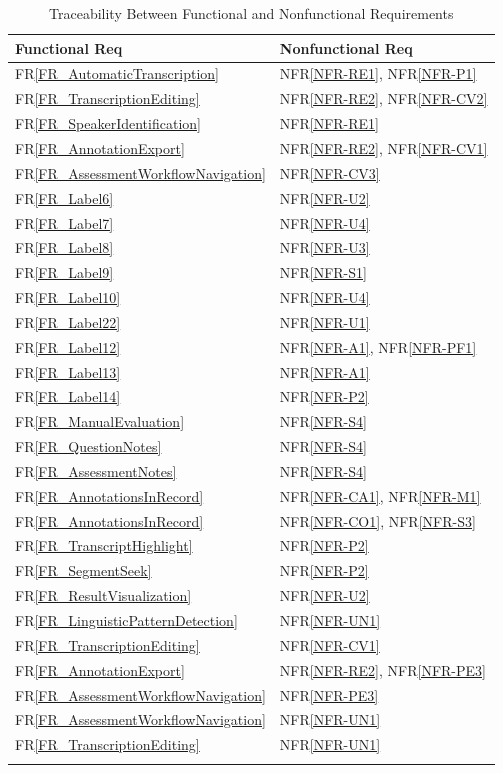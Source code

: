 \documentclass[12pt]{article}
\newcommand{\rref}[1]{FR\ref{#1}}
\newcommand{\nfrref}[1]{NFR\ref{#1}}
\begin{document}
\begin{longtable}{p{} p{}}

\toprule
Functional Req & Nonfunctional Req \\
\midrule
\rref{FR_AutomaticTranscription} & \nfrref{NFR-RE1}, \nfrref{NFR-P1} \\
\rref{FR_TranscriptionEditing} & \nfrref{NFR-RE2}, \nfrref{NFR-CV2} \\
\rref{FR_SpeakerIdentification} & \nfrref{NFR-RE1} \\
\rref{FR_AnnotationExport} & \nfrref{NFR-RE2}, \nfrref{NFR-CV1} \\
\rref{FR_AssessmentWorkflowNavigation} & \nfrref{NFR-CV3} \\
\rref{FR_Label6} & \nfrref{NFR-U2} \\
\rref{FR_Label7} & \nfrref{NFR-U4} \\
\rref{FR_Label8} & \nfrref{NFR-U3} \\
\rref{FR_Label9} & \nfrref{NFR-S1} \\
\rref{FR_Label10} & \nfrref{NFR-U4} \\
\rref{FR_Label22} & \nfrref{NFR-U1} \\
\rref{FR_Label12} & \nfrref{NFR-A1}, \nfrref{NFR-PF1} \\
\rref{FR_Label13} & \nfrref{NFR-A1} \\
\rref{FR_Label14} & \nfrref{NFR-P2} \\
\rref{FR_ManualEvaluation} & \nfrref{NFR-S4} \\
\rref{FR_QuestionNotes} & \nfrref{NFR-S4} \\
\rref{FR_AssessmentNotes} & \nfrref{NFR-S4} \\
\rref{FR_AnnotationsInRecord} & \nfrref{NFR-CA1}, \nfrref{NFR-M1} \\
\rref{FR_AnnotationsInRecord} & \nfrref{NFR-CO1}, \nfrref{NFR-S3} \\
\rref{FR_TranscriptHighlight} & \nfrref{NFR-P2} \\
\rref{FR_SegmentSeek} & \nfrref{NFR-P2} \\
\rref{FR_ResultVisualization} & \nfrref{NFR-U2} \\
\rref{FR_LinguisticPatternDetection} & \nfrref{NFR-UN1} \\
\rref{FR_TranscriptionEditing} & \nfrref{NFR-CV1} \\
\rref{FR_AnnotationExport} & \nfrref{NFR-RE2}, \nfrref{NFR-PE3} \\
\rref{FR_AssessmentWorkflowNavigation} & \nfrref{NFR-PE3} \\
\rref{FR_AssessmentWorkflowNavigation} & \nfrref{NFR-UN1} \\
\rref{FR_TranscriptionEditing} & \nfrref{NFR-UN1} \\

\bottomrule
\caption{Traceability Between Functional and Nonfunctional Requirements}
\label{tab:FR2Rtm}

\end{longtable}
\end{document}
